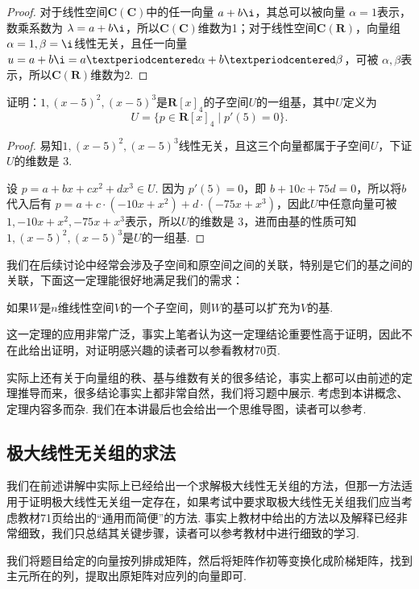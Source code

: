 \begin{proof}
    对于线性空间$\mathbf{C}(\mathbf{C})$中的任一向量 $a + b\i$，其总可以被向量 $\alpha = 1$表示，数乘系数为 $\lambda = a + b\i$，所以$\mathbf{C}(\mathbf{C})$维数为1；对于线性空间$\mathbf{C}(\mathbf{R})$，向量组 $\alpha = 1, \beta = \i$线性无关，且任一向量 $u = a + b\i = a·\alpha + b·\beta$，可被 $\alpha, \beta$表示，所以$\mathbf{C}(\mathbf{R})$维数为2.
\end{proof}

\begin{example}
    证明：$1,(x-5)^2,(x-5)^3$是$\mathbf{R}[x]_4$的子空间$U$的一组基，其中$U$定义为
    \[U=\{p\in\mathbf{R}[x]_4 \mid p'(5)=0\}.\]
\end{example}

\begin{proof}
    易知$1,(x-5)^2,(x-5)^3$线性无关，且这三个向量都属于子空间$U$，下证$U$的维数是 3.

    设 $p = a + bx + cx^2 + dx^3 \in U$. 因为 $p'(5) = 0$，即 $b + 10c +75d = 0$，所以将$b$代入后有 $p = a + c·(-10x + x^2) + d·(-75x + x^3)$，因此$U$中任意向量可被$1, -10x + x^2, -75x + x^3$表示，所以$U$的维数是 3，进而由基的性质可知$1,(x-5)^2,(x-5)^3$是$U$的一组基.
\end{proof}

我们在后续讨论中经常会涉及子空间和原空间之间的关联，特别是它们的基之间的关联，下面这一定理能很好地满足我们的需求：
\begin{theorem}
    如果$W$是$n$维线性空间$V$的一个子空间，则$W$的基可以扩充为$V$的基.
\end{theorem}
这一定理的应用非常广泛，事实上笔者认为这一定理结论重要性高于证明，因此不在此给出证明，对证明感兴趣的读者可以参看教材70页.

实际上还有关于向量组的秩、基与维数有关的很多结论，事实上都可以由前述的定理推导而来，很多结论事实上都非常自然，我们将习题中展示. 考虑到本讲概念、定理内容多而杂. 我们在本讲最后也会给出一个思维导图，读者可以参考.

\subsection{极大线性无关组的求法}

我们在前述讲解中实际上已经给出一个求解极大线性无关组的方法，但那一方法适用于证明极大线性无关组一定存在，如果考试中要求取极大线性无关组我们应当考虑教材71页给出的``通用而简便''的方法. 事实上教材中给出的方法以及解释已经非常细致，我们只总结其关键步骤，读者可以参考教材中进行细致的学习.
\begin{lemma}[极大线性无关组的求法]

    我们将题目给定的向量按列排成矩阵，然后将矩阵作初等变换化成阶梯矩阵，找到主元所在的列，提取出原矩阵对应列的向量即可.
\end{lemma}


